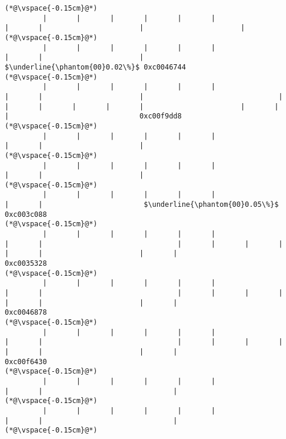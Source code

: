 \begin{lstlisting}[caption=NewDirectByteBuffer, label=profile:C2JNewDirectBuffer-512, numberbychapter=true, frame=lines, float, floatplacement=t]
(*@\vspace{-0.15cm}@*)
         |       |       |       |       |       |                       |       |                       |                       |
(*@\vspace{-0.15cm}@*)
         |       |       |       |       |       |                       |       |                       |                        $\underline{\phantom{00}0.02\%}$ 0xc0046744
(*@\vspace{-0.15cm}@*)
         |       |       |       |       |       |                       |       |                       |                                |       |       |       |       |       |                       |       |                       |                               0xc00f9dd8
(*@\vspace{-0.15cm}@*)
         |       |       |       |       |       |                       |       |                       |
(*@\vspace{-0.15cm}@*)
         |       |       |       |       |       |                       |       |                       |
(*@\vspace{-0.15cm}@*)
         |       |       |       |       |       |                       |       |                        $\underline{\phantom{00}0.05\%}$ 0xc003c088
(*@\vspace{-0.15cm}@*)
         |       |       |       |       |       |                       |       |                                |       |       |       |       |       |                       |       |                               0xc0035328
(*@\vspace{-0.15cm}@*)
         |       |       |       |       |       |                       |       |                                |       |       |       |       |       |                       |       |                               0xc0046878
(*@\vspace{-0.15cm}@*)
         |       |       |       |       |       |                       |       |                                |       |       |       |       |       |                       |       |                               0xc00f6430
(*@\vspace{-0.15cm}@*)
         |       |       |       |       |       |                       |       |                               |
(*@\vspace{-0.15cm}@*)
         |       |       |       |       |       |                       |       |                               |
(*@\vspace{-0.15cm}@*)

\end{lstlisting}
